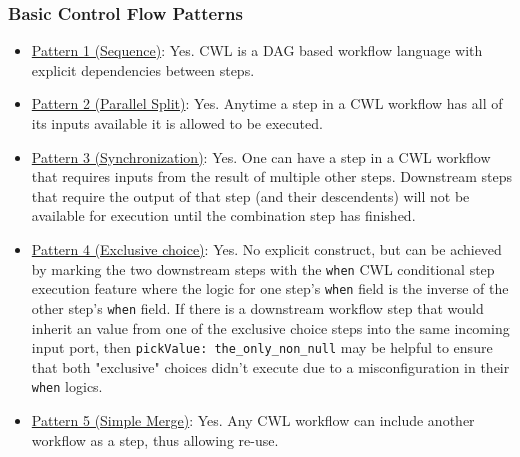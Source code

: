\subsubsection{Basic Control Flow Patterns}
\begin{itemize}

\item \href{http://www.workflowpatterns.com/patterns/control/basic/wcp1.php}{Pattern 1 (Sequence)}: Yes. CWL is a DAG based workflow language with explicit dependencies between steps.

\item \href{http://www.workflowpatterns.com/patterns/control/basic/wcp2.php}{Pattern 2 (Parallel Split)}: Yes. Anytime a step in a CWL workflow has all of its inputs available it is allowed to be executed.

\item \href{http://www.workflowpatterns.com/patterns/control/basic/wcp3.php}{Pattern 3 (Synchronization)}: Yes. One can have a step in a CWL workflow that requires inputs from the result of multiple other steps. Downstream steps that require the output of that step (and their descendents) will not be available for execution until the combination step has finished.

\item \href{http://www.workflowpatterns.com/patterns/control/basic/wcp4.php}{Pattern 4 (Exclusive choice)}: Yes. No explicit construct, but can be achieved by marking the two downstream steps with the \verb|when| CWL conditional step execution feature where the logic for one step's \verb|when| field is the inverse of the other step's \verb|when| field. If there is a downstream workflow step that would inherit an value from one of the exclusive choice steps into the same incoming input port, then \verb|pickValue: the_only_non_null| may be helpful to ensure that both "exclusive" choices didn't execute due to a misconfiguration in their \verb|when| logics.

\item \href{http://www.workflowpatterns.com/patterns/control/basic/wcp5.php}{Pattern 5 (Simple Merge)}: Yes. Any CWL workflow can include another workflow as a step, thus allowing re-use.
\end{itemize}
